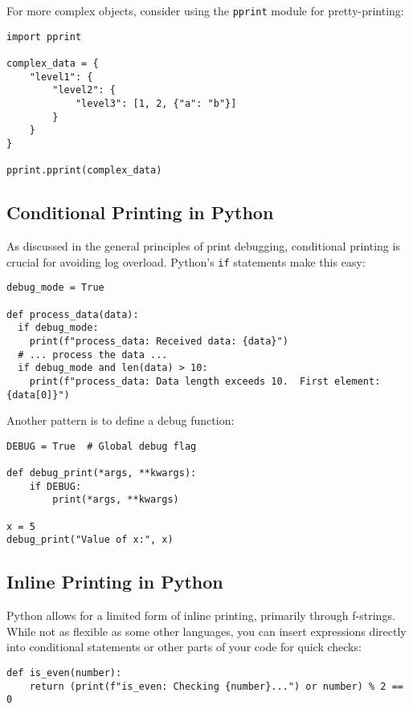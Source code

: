 \documentclass{article}
\begin{document}
{{{{For more complex objects, consider using the \texttt{pprint} module for pretty-printing:

\begin{verbatim}
import pprint

complex_data = {
    "level1": {
        "level2": {
            "level3": [1, 2, {"a": "b"}]
        }
    }
}

pprint.pprint(complex_data)
\end{verbatim}

\subsection*{Conditional Printing in Python}

As discussed in the general principles of print debugging, conditional printing is crucial for avoiding log overload. Python's \texttt{if} statements make this easy:

\begin{verbatim}
debug_mode = True

def process_data(data):
  if debug_mode:
    print(f"process_data: Received data: {data}")
  # ... process the data ...
  if debug_mode and len(data) > 10:
    print(f"process_data: Data length exceeds 10.  First element: {data[0]}")
\end{verbatim}

Another pattern is to define a debug function:

\begin{verbatim}
DEBUG = True  # Global debug flag

def debug_print(*args, **kwargs):
    if DEBUG:
        print(*args, **kwargs)

x = 5
debug_print("Value of x:", x)
\end{verbatim}

\subsection*{Inline Printing in Python}

Python allows for a limited form of inline printing, primarily through f-strings. While not as flexible as some other languages, you can insert expressions directly into conditional statements or other parts of your code for quick checks:

\begin{verbatim}
def is_even(number):
    return (print(f"is_even: Checking {number}...") or number) % 2 == 0
\end{verbatim}

}}}}
\end{document}
